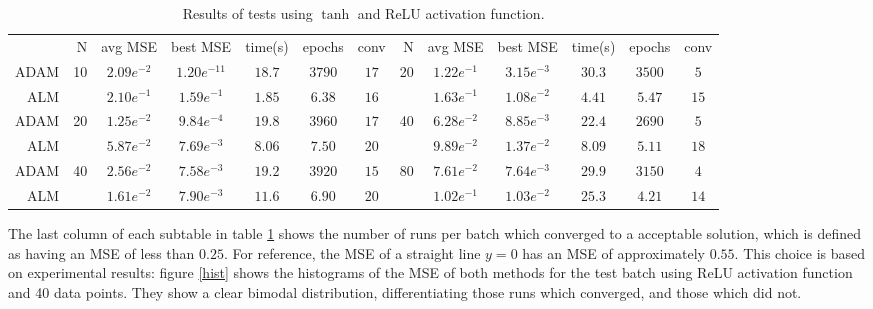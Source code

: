 \begin{table}
{\begin{tabular}{r | r| c c c c c || r| c c c c c|}
        &                   N & avg MSE       & best MSE        & time(s)  & epochs   & conv   &                   N & avg MSE        & best MSE       & time(s)  & epochs   & conv   \\ \cline{2-13}
    ADAM& \multirow{2}{*}{10} & $ 2.09e^{-2} $ & $1.20e^{-11} $ & $ 18.7 $ & $ 3790 $ & $ 17 $ & \multirow{2}{*}{20} & $ 1.22e^{-1} $ & $ 3.15e^{-3} $ & $ 30.3 $ & $ 3500 $ & $ 5  $ \\
    ALM & 				      & $ 2.10e^{-1} $ & $ 1.59e^{-1} $ & $ 1.85 $ & $ 6.38 $ & $ 16 $ & 				     & $ 1.63e^{-1} $ & $ 1.08e^{-2} $ & $ 4.41 $ & $ 5.47 $ & $ 15 $ \\ \cline{2-13}
    ADAM& \multirow{2}{*}{20} & $ 1.25e^{-2} $ & $ 9.84e^{-4} $ & $ 19.8 $ & $ 3960 $ & $ 17 $ & \multirow{2}{*}{40} & $ 6.28e^{-2} $ & $ 8.85e^{-3} $ & $ 22.4 $ & $ 2690 $ & $ 5  $ \\
    ALM & 					  & $ 5.87e^{-2} $ & $ 7.69e^{-3} $ & $ 8.06 $ & $ 7.50 $ & $ 20 $ & 					 & $ 9.89e^{-2} $ & $ 1.37e^{-2} $ & $ 8.09 $ & $ 5.11 $ & $ 18 $ \\ \cline{2-13}
    ADAM& \multirow{2}{*}{40} & $ 2.56e^{-2} $ & $ 7.58e^{-3} $ & $ 19.2 $ & $ 3920 $ & $ 15 $ & \multirow{2}{*}{80} & $ 7.61e^{-2} $ & $ 7.64e^{-3} $ & $ 29.9 $ & $ 3150 $ & $ 4  $ \\
    ALM &                     & $ 1.61e^{-2} $ & $ 7.90e^{-3} $ & $ 11.6 $ & $ 6.90 $ & $ 20 $ &                     & $ 1.02e^{-1} $ & $ 1.03e^{-2} $ & $ 25.3 $ & $ 4.21 $ & $ 14 $ \\ \cline{2-13}


\end{tabular}
}
\caption{Results of tests using $\tanh$ and ReLU activation function.}
\label{restab}

\end{table}

The last column of each subtable in table \ref{restab} shows the number of runs per batch which converged to a acceptable solution, which is defined as having an MSE of less than $0.25$. For reference, the MSE of a straight line $y=0$ has an MSE of approximately $0.55$. This choice is based on experimental results: figure \ref{hist} shows the histograms of the MSE of both methods for the test batch using ReLU activation function and 40 data points. They show a clear bimodal distribution, differentiating those runs which converged, and those which did not.

